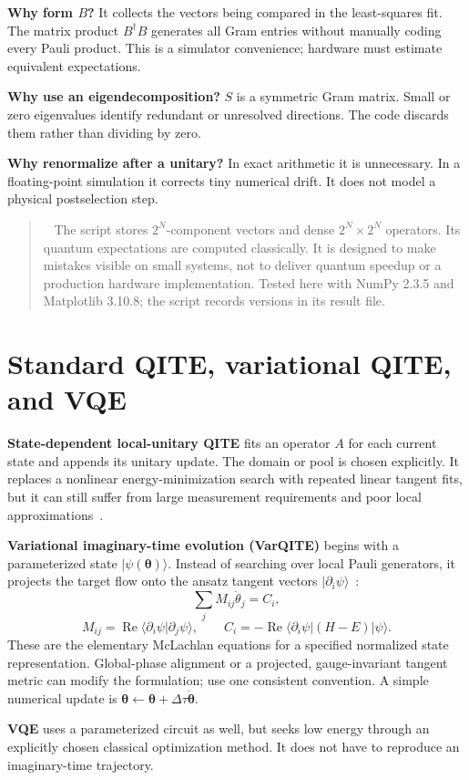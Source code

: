 \documentclass[11pt,a4paper]{article}
\newcommand{\ket}[1]{\lvert #1\rangle}
\newcommand{\bra}[1]{\langle #1\rvert}
\newcommand{\braket}[2]{\langle #1\vert #2\rangle}
\newcommand{\Rea}{\operatorname{Re}}
\newcommand{\dt}{\Delta\tau}
\newcommand{\lesson}[2]{\clearpage\section{#1}\label{#2}}
\newenvironment{caution}[1][Important distinction]{\par\smallskip\begin{quotation}\noindent{\bfseries\textcolor{alertred}{#1.}}\ }{\end{quotation}\smallskip}
\begin{document}
\textbf{Why form $B$?} It collects the vectors being compared in the least-squares fit. The matrix product $B^\dagger B$ generates all Gram entries without manually coding every Pauli product. This is a simulator convenience; hardware must estimate equivalent expectations.

\textbf{Why use an eigendecomposition?} $S$ is a symmetric Gram matrix. Small or zero eigenvalues identify redundant or unresolved directions. The code discards them rather than dividing by zero.

\textbf{Why renormalize after a unitary?} In exact arithmetic it is unnecessary. In a floating-point simulation it corrects tiny numerical drift. It does not model a physical postselection step.

\begin{caution}[The exponential wall remains in this teaching code]
The script stores $2^N$-component vectors and dense $2^N\times2^N$ operators. Its quantum expectations are computed classically. It is designed to make mistakes visible on small systems, not to deliver quantum speedup or a production hardware implementation. Tested here with NumPy 2.3.5 and Matplotlib 3.10.8; the script records versions in its result file.
\end{caution}

\lesson{Standard QITE, variational QITE, and VQE}{sec:varqite}
\textbf{State-dependent local-unitary QITE} fits an operator $A$ for each current state and appends its unitary update. The domain or pool is chosen explicitly. It replaces a nonlinear energy-minimization search with repeated linear tangent fits, but it can still suffer from large measurement requirements and poor local approximations~\cite{motta}.

\textbf{Variational imaginary-time evolution (VarQITE)} begins with a parameterized state $\ket{\psi(\bm\theta)}$. Instead of searching over local Pauli generators, it projects the target flow onto the ansatz tangent vectors $\ket{\partial_i\psi}$~\cite{mcardle,yuan}:
\[
\sum_j M_{ij}\dot\theta_j=C_i,
\]
\[
M_{ij}=\Rea\braket{\partial_i\psi}{\partial_j\psi},\qquad
C_i=-\Rea\bra{\partial_i\psi}(H-E)\ket{\psi}.
\]
These are the elementary McLachlan equations for a specified normalized state representation. Global-phase alignment or a projected, gauge-invariant tangent metric can modify the formulation; use one consistent convention. A simple numerical update is $\bm\theta\leftarrow\bm\theta+\dt\dot{\bm\theta}$.

\textbf{VQE} uses a parameterized circuit as well, but seeks low energy through an explicitly chosen classical optimization method. It does not have to reproduce an imaginary-time trajectory.
\end{document}
